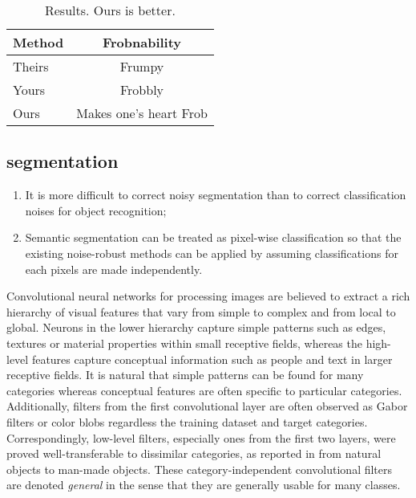\begin{table}
\begin{center}
\begin{tabular}{|l|c|}
\hline
Method & Frobnability \\
\hline\hline
Theirs & Frumpy \\
Yours & Frobbly \\
Ours & Makes one's heart Frob\\
\hline
\end{tabular}
\end{center}
\caption{Results.   Ours is better.}
\end{table}


\subsection{segmentation}

\begin{enumerate}
  \item It is more difficult to correct noisy segmentation than to correct classification noises for object recognition;
  \item Semantic segmentation can be treated as pixel-wise classification so that the existing noise-robust methods can be applied by assuming classifications for each pixels are made independently.
\end{enumerate}

Convolutional neural networks for processing images are believed to extract a rich hierarchy of visual features that vary from simple to complex and from local to global.\cite{girshick2014rich}
Neurons in the lower hierarchy capture simple patterns such as edges, textures or material properties within small receptive fields, whereas the high-level features capture conceptual information such as people and text in larger receptive fields.
It is natural that simple patterns can be found for many categories whereas conceptual features are often specific to particular categories.
Additionally, filters from the first convolutional layer are often observed as Gabor filters or color blobs regardless the training dataset and target categories.\cite{zeiler2014visualizing,lee2009convolutional,krizhevsky2012imagenet,shin2016deep}
Correspondingly, low-level filters, especially ones from the first two layers, were proved well-transferable to dissimilar categories, as reported in \cite{yosinski2014transferable} from natural objects to man-made objects.
These category-independent convolutional filters are denoted \textit{general} in the sense that they are generally usable for many classes.

